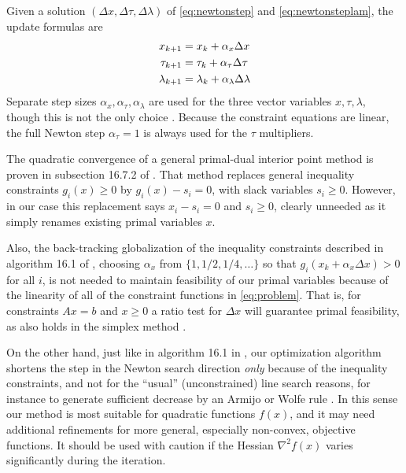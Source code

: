 \documentclass[11pt]{article}
\newcommand{\grad}{\nabla}
\begin{document}
Given a solution $(\Delta x,\Delta\tau,\Delta\lambda)$ of \eqref{eq:newtonstep} and \eqref{eq:newtonsteplam}, the update formulas are
\begin{align}
x_{k+1} &= x_k + \alpha_x \Delta x \label{eq:updates} \\
\tau_{k+1} &= \tau_k + \alpha_\tau \Delta \tau \notag \\
\lambda_{k+1} &= \lambda_k + \alpha_\lambda \Delta \lambda \notag
\end{align}
Separate step sizes $\alpha_x,\alpha_\tau,\alpha_\lambda$ are used for the three vector variables $x,\tau,\lambda$, though this is not the only choice \cite{YamashitaYabe1996}.  Because the constraint equations are linear, the full Newton step $\alpha_\tau=1$ is always used for the $\tau$ multipliers.

The quadratic convergence of a general primal-dual interior point method is proven in subsection 16.7.2 of \cite{GrivaNashSofer2009}.  That method replaces general inequality constraints $g_i(x)\ge 0$ by $g_i(x) - s_i =0$, with slack variables $s_i\ge 0$.  However, in our case this replacement says $x_i-s_i=0$ and $s_i\ge 0$, clearly unneeded as it simply renames existing primal variables $x$.

Also, the back-tracking globalization of the inequality constraints described in algorithm 16.1 of \cite{GrivaNashSofer2009}, choosing $\alpha_x$ from $\{1,1/2,1/4,\dots\}$ so that $g_i(x_k + \alpha_x \Delta x) > 0$ for all $i$, is not needed to maintain feasibility of our primal variables because of the linearity of all of the constraint functions in \eqref{eq:problem}.  That is, for constraints $Ax=b$ and $x\ge 0$ a ratio test for $\Delta x$ will guarantee primal feasibility, as also holds in the simplex method \cite[chapter 5]{GrivaNashSofer2009}.

On the other hand, just like in algorithm 16.1 in \cite{GrivaNashSofer2009}, our optimization algorithm shortens the step in the Newton search direction \emph{only} because of the inequality constraints, and not for the ``usual'' (unconstrained) line search reasons, for instance to generate sufficient decrease by an Armijo or Wolfe rule \cite[section 11.5]{GrivaNashSofer2009}.  In this sense our method is most suitable for quadratic functions $f(x)$, and it may need additional refinements for more general, especially non-convex, objective functions.  It should be used with caution if the Hessian $\grad^2 f(x)$ varies significantly during the iteration.
\end{document}
